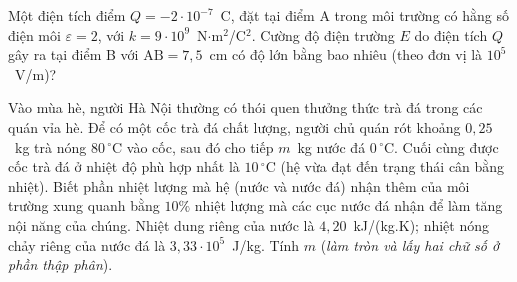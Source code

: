 	\begin{ex}%
		Một điện tích điểm $Q=-2\cdot 10^{-7}$~C, đặt tại điểm A trong môi trường có hằng số điện môi $\varepsilon=2$, với $k=9\cdot 10^9$~N$\cdot$m$^2$/C$^2$. Cường độ điện trường $E$ do điện tích $Q$ gây ra tại điểm B với $\text{AB}=7{,}5$~cm có độ lớn bằng bao nhiêu (theo đơn vị là $10^5$~V/m)?
		\par
	\end{ex}

	\begin{ex}%
		Vào mùa hè, người Hà Nội thường có thói quen thưởng thức trà đá trong các quán vỉa hè. Để có một cốc trà đá chất lượng, người chủ quán rót khoảng $0{,}25$~kg trà nóng $80\,^\circ\text{C}$ vào cốc, sau đó cho tiếp $m$~kg nước đá $0\,^\circ\text{C}$. Cuối cùng được cốc trà đá ở nhiệt độ phù hợp nhất là $10\,^\circ\text{C}$ (hệ vừa đạt đến trạng thái cân bằng nhiệt). Biết phần nhiệt lượng mà hệ (nước và nước đá) nhận thêm của môi trường xung quanh bằng $10\%$ nhiệt lượng mà các cục nước đá nhận để làm tăng nội năng của chúng. Nhiệt dung riêng của nước là $4{,}20$~kJ/(kg.K); nhiệt nóng chảy riêng của nước đá là $3{,}33\cdot 10^5$~J/kg. Tính $m$ (\textit{làm tròn và lấy hai chữ số ở phần thập phân}).
		\par
	\end{ex}

